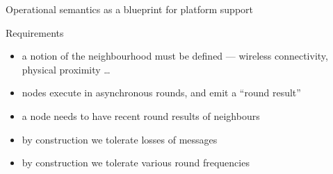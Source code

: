 \documentclass[presentation, 8pt]{beamer}\mode<presentation>{\usetheme{AMSBolognaFC}}
\begin{document}
\begin{frame}{Operational semantics as a blueprint for platform support}
	\begin{exampleblock}{Requirements}
	\begin{itemize}
		\item a notion of the neighbourhood must be defined --- wireless connectivity, physical proximity \dots
		\item nodes execute in asynchronous rounds, and emit a ``round result''
		\item a node needs to have recent round results of neighbours
		\item by construction we tolerate losses of messages
		\item by construction we tolerate various round frequencies
	\end{itemize}
	\end{exampleblock}
\end{frame}
	
\end{document}
